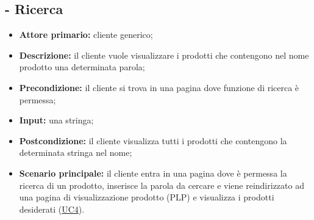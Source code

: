 \stepUserCase
\subsection{ - Ricerca}
\begin{itemize}
    \item \textbf{Attore primario:} cliente generico;
    \item \textbf{Descrizione:} il cliente vuole visualizzare i prodotti che contengono nel nome prodotto una determinata parola;
    \item \textbf{Precondizione:} il cliente si trova in una pagina dove funzione di ricerca è permessa;
    \item \textbf{Input:} una stringa;
    \item \textbf{Postcondizione:} il cliente visualizza tutti i prodotti che contengono la determinata stringa nel nome;
    \item \textbf{Scenario principale:} il cliente entra in una pagina dove è permessa la ricerca di un prodotto, inserisce la parola da cercare e viene reindirizzato ad una pagina di visualizzazione prodotto (PLP) e visualizza i prodotti desiderati (\hyperref[UC4]{UC4}).
\end{itemize}

\stepUserCase
